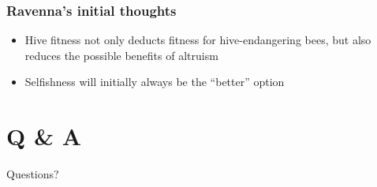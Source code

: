 \documentclass{beamer}
\begin{document}
  \begin{frame}[c]\frametitle{Ravenna's initial thoughts}
    \begin{itemize}
      \item Hive fitness not only deducts fitness for hive-endangering bees,
            but also reduces the possible benefits of altruism
      \item Selfishness will initially always be the ``better'' option
    \end{itemize}
  \end{frame}


  \section{Q \& A} %
  \label{sec:q_and_a}
    \begin{frame}{Questions?}
      \titlepage
    \end{frame}
\end{document}
